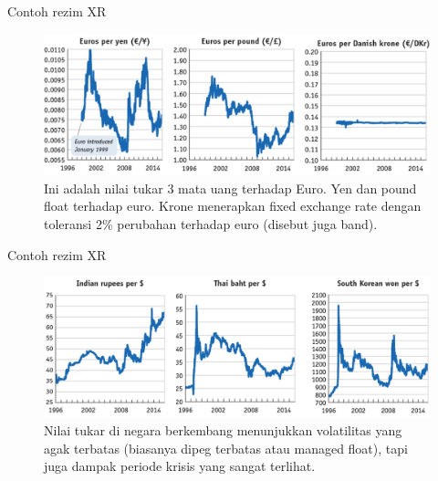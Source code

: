 \documentclass[
  ignorenonframetext,
]{beamer}
\begin{document}
\begin{frame}{Contoh rezim XR}
\label{contoh-rezim-xr-1}
\begin{figure}[H]

{\centering \includegraphics{Picture3.jpg}

}

\caption{Ini adalah nilai tukar 3 mata uang terhadap Euro. Yen dan pound
float terhadap euro. Krone menerapkan fixed exchange rate dengan
toleransi 2\% perubahan terhadap euro (disebut juga band).}

\end{figure}%
\end{frame}

\begin{frame}{Contoh rezim XR}
\label{contoh-rezim-xr-2}
\begin{figure}[H]

{\centering \includegraphics{Picture4.jpg}

}

\caption{Nilai tukar di negara berkembang menunjukkan volatilitas yang
agak terbatas (biasanya dipeg terbatas atau managed float), tapi juga
dampak periode krisis yang sangat terlihat.}

\end{figure}%
\end{frame}
\end{document}
